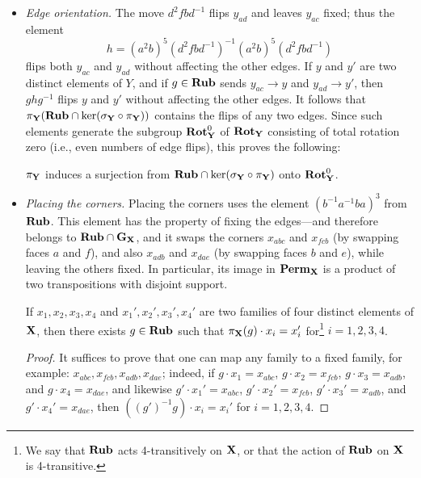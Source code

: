 \begin{itemize}
    \item \emph{Edge orientation.} The move $d^2fbd^{-1}$ flips $y_{ad}$ and leaves $y_{ac}$ fixed; thus the element
        $$
        h = (a^2b)^5 (d^2fbd^{-1})^{-1} (a^2b)^5 (d^2fbd^{-1})
        $$
        flips both $y_{ac}$ and $y_{ad}$ without affecting the other edges.
        If $y$ and $y'$ are two distinct elements of $Y$, and if $g \in \mathbf{Rub}$ sends $y_{ac} \to y$ and $y_{ad} \to y'$, then $ghg^{-1}$ flips $y$ and $y'$ without affecting the other edges.
        It follows that $\pi_{\mathbf{Y}}(\mathbf{Rub} \cap \ker(\sigma_{\mathbf{Y}} \circ \pi_{\mathbf{Y}}))$ contains the flips of any two edges.
        Since such elements generate the subgroup $\mathbf{Rot}_{\mathbf{Y}}^0$ of $\mathbf{Rot}_{\mathbf{Y}}$ consisting of total rotation zero (i.e., even numbers of edge flips), this proves the following:

    \begin{lemma}
        $\pi_{\mathbf{Y}}$ induces a surjection from $\mathbf{Rub} \cap \ker(\sigma_{\mathbf{Y}} \circ \pi_{\mathbf{Y}})$ onto $\mathbf{Rot}_{\mathbf{Y}}^0$.
    \end{lemma}

    \item \emph{Placing the corners.}
    Placing the corners uses the element $(b^{-1}a^{-1}ba)^3$ from $\mathbf{Rub}$.
    This element has the property of fixing the edges—and therefore belongs to $\mathbf{Rub} \cap \mathbf{G}_{\mathbf{X}}$, and it swaps the corners $x_{abc}$ and $x_{fcb}$ (by swapping faces $a$ and $f$), and also $x_{adb}$ and $x_{dae}$ (by swapping faces $b$ and $e$), while leaving the others fixed.
    In particular, its image in $\mathbf{Perm}_{\mathbf{X}}$ is a product of two transpositions with disjoint support.

    \begin{lemma}
        If $x_1, x_2, x_3, x_4$ and $x_1', x_2', x_3', x_4'$ are two families of four distinct elements of $\mathbf{X}$, then there exists $g \in \mathbf{Rub}$ such that $\pi_{\mathbf{X}}(g) \cdot x_i = x_i'$ for\footnote{We say that $\mathbf{Rub}$ acts 4-transitively on $\mathbf{X}$, or that the action of $\mathbf{Rub}$ on $\mathbf{X}$ is 4-transitive.} $i = 1, 2, 3, 4$.
    \end{lemma}
    \begin{proof}
        It suffices to prove that one can map any family to a fixed family, for example: $x_{abc}, x_{fcb}, x_{adb}, x_{dae}$; indeed, if $g \cdot x_1 = x_{abc}$, $g \cdot x_2 = x_{fcb}$, $g \cdot x_3 = x_{adb}$, and $g \cdot x_4 = x_{dae}$, and likewise
        $g' \cdot x_1' = x_{abc}$, $g' \cdot x_2' = x_{fcb}$, $g' \cdot x_3' = x_{adb}$, and $g' \cdot x_4' = x_{dae}$, then
        $((g')^{-1}g) \cdot x_i = x_i'$ for $i = 1, 2, 3, 4$.


\end{proof}
\end{itemize}
